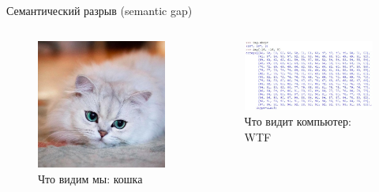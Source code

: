 \documentclass[aspectratio=169]{beamer}
\begin{document}
\begin{frame}{Семантический разрыв (semantic gap)}
    \begin{columns}
        \begin{column}{.35\linewidth}
            \begin{figure}
                \includegraphics[width=\linewidth]{graphs/fig5.jpg}
                \caption*{Что видим мы: кошка}
            \end{figure}
            
        \end{column}
        \pause{}
        \begin{column}{.65\linewidth}
            \begin{figure}
                \includegraphics[width=\linewidth]{graphs/fig7.jpg}
                \caption*{Что видит компьютер: WTF}
            \end{figure}
        \end{column}
    \end{columns}
\end{frame}
\end{document}
